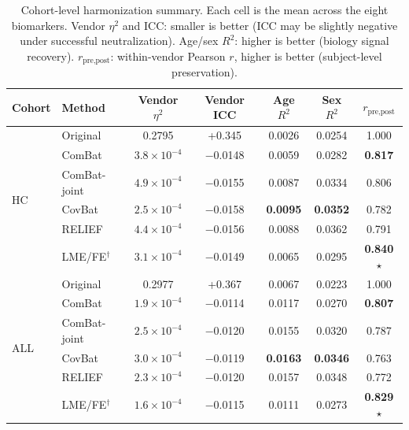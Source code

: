 \documentclass[12pt,a4paper]{article}
\begin{document}
\begin{table}[H]
\centering
\caption{Cohort-level harmonization summary. Each cell is the mean across the eight biomarkers.\newline
Vendor $\eta^2$ and ICC: smaller is better (ICC may be slightly negative under successful neutralization).\newline
Age/sex $R^2$: higher is better (biology signal recovery).\newline
$r_{\text{pre,post}}$: within-vendor Pearson $r$, higher is better (subject-level preservation).}
\label{tab:summary}
\begin{tabular}{llccccc}
\toprule
\textbf{Cohort} & \textbf{Method} & \textbf{Vendor $\eta^2$} & \textbf{Vendor ICC} & \textbf{Age $R^2$} & \textbf{Sex $R^2$} & \textbf{$r_{\text{pre,post}}$} \\
\midrule
\multirow{6}{*}{HC} & Original      & 0.2795 & +0.345 & 0.0026 & 0.0254 & 1.000 \\
                     & ComBat        & $3.8\times10^{-4}$ & $-$0.0148 & 0.0059 & 0.0282 & \textbf{0.817} \\
                     & ComBat-joint  & $4.9\times10^{-4}$ & $-$0.0155 & 0.0087 & 0.0334 & 0.806 \\
                     & CovBat        & $2.5\times10^{-4}$ & $-$0.0158 & \textbf{0.0095} & \textbf{0.0352} & 0.782 \\
                     & RELIEF        & $4.4\times10^{-4}$ & $-$0.0156 & 0.0088 & 0.0362 & 0.791 \\
                     & LME/FE$^\dagger$ & $3.1\times10^{-4}$ & $-$0.0149 & 0.0065 & 0.0295 & \textbf{0.840} $\star$ \\
\midrule
\multirow{6}{*}{ALL}& Original      & 0.2977 & +0.367 & 0.0067 & 0.0223 & 1.000 \\
                     & ComBat        & $1.9\times10^{-4}$ & $-$0.0114 & 0.0117 & 0.0270 & \textbf{0.807} \\
                     & ComBat-joint  & $2.5\times10^{-4}$ & $-$0.0120 & 0.0155 & 0.0320 & 0.787 \\
                     & CovBat        & $3.0\times10^{-4}$ & $-$0.0119 & \textbf{0.0163} & \textbf{0.0346} & 0.763 \\
                     & RELIEF        & $2.3\times10^{-4}$ & $-$0.0120 & 0.0157 & 0.0348 & 0.772 \\
                     & LME/FE$^\dagger$ & $1.6\times10^{-4}$ & $-$0.0115 & 0.0111 & 0.0273 & \textbf{0.829} $\star$ \\

\end{tabular}
\end{table}
\end{document}
